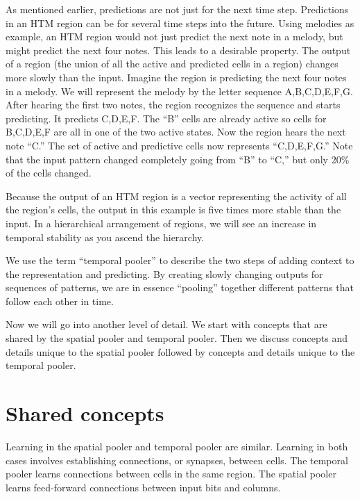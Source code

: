 \documentclass{report}
\begin{document}
\begin{enumerate}
As mentioned earlier, predictions are not just for the next time
step. Predictions in an HTM region can be for several time steps into
the future. Using melodies as example, an HTM region would not just
predict the next note in a melody, but might predict the next four
notes. This leads to a desirable property. The output of a region (the
union of all the active and predicted cells in a region) changes more
slowly than the input. Imagine the region is predicting the next four
notes in a melody. We will represent the melody by the letter sequence
A,B,C,D,E,F,G. After hearing the first two notes, the region
recognizes the sequence and starts predicting. It predicts
C,D,E,F. The ``B'' cells are already active so cells for B,C,D,E,F are
all in one of the two active states. Now the region hears the next
note ``C.'' The set of active and predictive cells now represents
``C,D,E,F,G.'' Note that the input pattern changed completely going
from ``B'' to ``C,'' but only 20\% of the cells changed.

\end{enumerate}

Because the output of an HTM region is a vector representing the
activity of all the region's cells, the output in this example is five
times more stable than the input. In a hierarchical arrangement of
regions, we will see an increase in temporal stability as you ascend
the hierarchy.

We use the term ``temporal pooler'' to describe the two steps of
adding context to the representation and predicting. By creating
slowly changing outputs for sequences of patterns, we are in essence
``pooling'' together different patterns that follow each other in
time.

Now we will go into another level of detail. We start with concepts
that are shared by the spatial pooler and temporal pooler. Then we
discuss concepts and details unique to the spatial pooler followed by
concepts and details unique to the temporal pooler.

\section*{Shared concepts}

Learning in the spatial pooler and temporal pooler are
similar. Learning in both cases involves establishing connections, or
synapses, between cells. The temporal pooler learns connections
between cells in the same region. The spatial pooler learns
feed-forward connections between input bits and columns.
\end{document}
